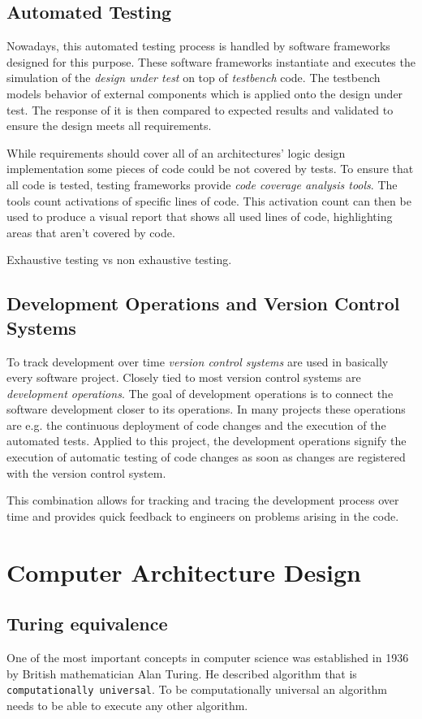 \subsection{Automated Testing}
Nowadays, this automated testing process is handled by software frameworks designed for this purpose. These software frameworks instantiate and executes the simulation of the \textit{design under test} on top of \textit{testbench} code. The testbench models behavior of external components which is applied onto the design under test. The response of it is then compared to expected results and validated to ensure the design meets all requirements.

While requirements should cover all of an architectures' logic design implementation some pieces of code could be not covered by tests. To ensure that all code is tested, testing frameworks provide \textit{code coverage analysis tools}. The tools count activations of specific lines of code. This activation count can then be used to produce a visual report that shows all used lines of code, highlighting areas that aren't covered by code.

Exhaustive testing vs non exhaustive testing.

\subsection{Development Operations and Version Control Systems}
To track development over time \textit{version control systems} are used in basically every software project. Closely tied to most version control systems are \textit{development operations}. The goal of development operations is to connect the software development closer to its operations. In many projects these operations are e.g. the continuous deployment of code changes and the execution of the automated tests. Applied to this project, the development operations signify the execution of automatic testing of code changes as soon as changes are registered with the version control system. 

This combination allows for tracking and tracing the development process over time and provides quick feedback to engineers on problems arising in the code.

\section{Computer Architecture Design}
\subsection{Turing equivalence}
One of the most important concepts in computer science was established in 1936 by British mathematician Alan Turing. He described algorithm that is \texttt{computationally universal}. To be computationally universal an algorithm needs to be able to execute any other algorithm. \cite{britannicaturing} 

